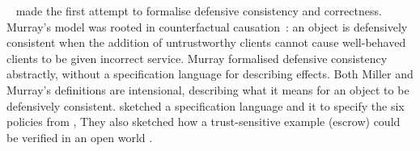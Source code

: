 {%
~\cite{Murray10dphil} made the first attempt to formalise defensive consistency and
correctness.  Murray's model was rooted in
counterfactual causation~\cite{Lewis_73}: an object is defensively
consistent when the addition of untrustworthy clients cannot cause
well-behaved clients to be given incorrect service.  Murray formalised
defensive consistency %
abstractly, 
without a specification language for describing effects.
Both Miller and
Murray's definitions are intensional, describing what it means for an
object to be defensively consistent.
%
%
%
\cite{WAS-OOPSLA14-TR} %
sketched a  specification language and    it to  
specify the six policies from \cite{MillerPhD}, %
They also
  sketched how 
a trust-sensitive 
example (escrow) could be verified in an open world
\cite{swapsies}. 
 

}
